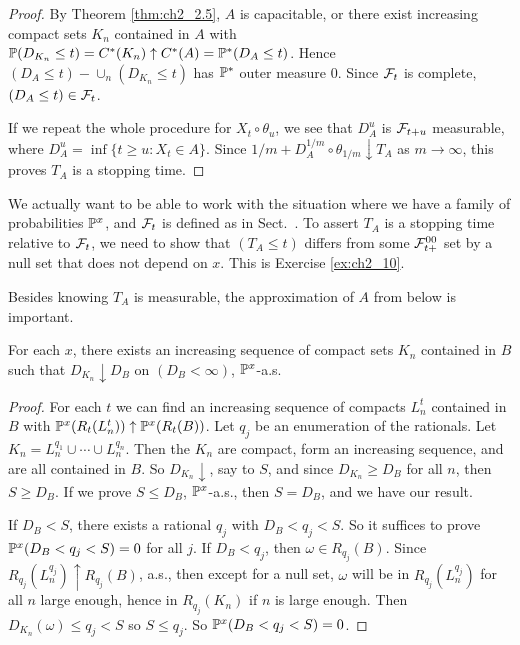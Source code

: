 \begin{proof}
By Theorem \ref{thm:ch2_2.5}, $A$ is capacitable, or there exist increasing compact sets $K_n$ contained in $A$ with $\P(D_{K_n} \leq t) = C^*(K_n) \uparrow C^*(A) = \P^*(D_A \leq t)$. Hence $(D_A \leq t) - \cup_n(D_{K_n} \leq t)$ has $\P^*$ outer measure $0$. Since $\FC_t$ is complete, $(D_A \leq t) \in \FC_t$.


If we repeat the whole procedure for $X_t \circ \theta_u$, we see that $D_A^u$ is $\FC_{t+u}$ measurable, where $D_A^u = \inf\{t \geq u : X_t \in A\}$. Since $1/m + D_A^{1/m} \circ \theta_{1/m} \downarrow T_A$ as $m \to \infty$, this proves $T_A$ is a stopping time.
\end{proof}

We actually want to be able to work with the situation where we have a family of probabilities $\P^x$, and $\FC_t$ is defined as in Sect.\ . To assert $T_A$ is a stopping time relative to $\FC_t$, we need to show that $(T_A \leq t)$ differs from some $\FC_{t+}^{00}$ set by a null set that does not depend on $x$. This is Exercise \ref{ex:ch2_10}.

Besides knowing $T_A$ is measurable, the approximation of $A$ from below is important.

\begin{proposition}\label{prop:ch2_2.9}
For each $x$, there exists an increasing sequence of compact sets $K_n$ contained in $B$ such that $D_{K_n} \downarrow D_B$ on $(D_B < \infty)$, $\P^x$-a.s.
\end{proposition}

\begin{proof}
For each $t$ we can find an increasing sequence of compacts $L_n^t$ contained in $B$ with $\P^x(R_t(L_n^t)) \uparrow \P^x(R_t(B))$. Let $q_j$ be an enumeration of the rationals. Let $K_n = L_n^{q_1} \cup \cdots \cup L_n^{q_n}$. Then the $K_n$ are compact, form an increasing sequence, and are all contained in $B$. So $D_{K_n} \downarrow$, say to $S$, and since $D_{K_n} \geq D_B$ for all $n$, then $S \geq D_B$. If we prove $S\le D_B$, $\P^x$-a.s., then $S=D_B$, and we have our result.


If $D_B < S$, there exists a rational $q_j$ with $D_B<q_j<S$. So it suffices to prove $\P^x(D_B<q_j<S)=0$ for all $j$. If $D_B<q_j$, then $\omega \in R_{q_j}(B)$. Since $R_{q_j}(L_n^{q_j}) \uparrow R_{q_j}(B)$, a.s., then except for a null set, $\omega$ will be in $R_{q_j}(L_n^{q_j})$ for all $n$ large enough, hence in $R_{q_j}(K_n)$ if $n$ is large enough. Then $D_{K_n}(\omega) \leq q_j < S$ so $S\leq q_j$. So $\P^x(D_B<q_j<S)=0$.
\end{proof}

